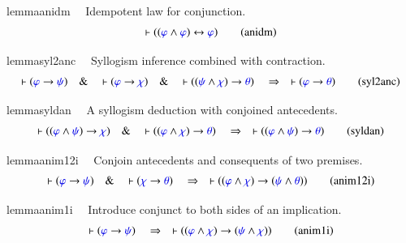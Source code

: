 \begin{restatable}{lemma}{anidm}~~ Idempotent law for conjunction. 
\begin{align}
\vdash ( ( \mw{\varphi} \wedge \mw{\varphi} ) \leftrightarrow \mw{\varphi}
    )\label{eq:anidm}\tag{anidm}
\end{align}
\end{restatable}

\begin{restatable}{lemma}{syl2anc}~~ Syllogism inference combined with
contraction.  ~
\begin{align}
\vdash ( \mw{\varphi} \rightarrow \mw{\psi} )\quad\&\quad \vdash ( \mw{\varphi}
    \rightarrow \mw{\chi} )\quad\&\quad \vdash ( ( \mw{\psi} \wedge \mw{\chi} )
    \rightarrow \mw{\theta} )\quad\Rightarrow\quad \vdash ( \mw{\varphi}
    \rightarrow \mw{\theta} )\label{eq:syl2anc}\tag{syl2anc}
\end{align}
\end{restatable}

\begin{restatable}{lemma}{syldan}~~ A syllogism deduction with conjoined
antecedents.  ~  ~
\begin{align}
\vdash ( ( \mw{\varphi} \wedge \mw{\psi} ) \rightarrow \mw{\chi} )\quad\&\quad
    \vdash ( ( \mw{\varphi} \wedge \mw{\chi} ) \rightarrow \mw{\theta}
    )\quad\Rightarrow\quad \vdash ( ( \mw{\varphi} \wedge \mw{\psi} )
    \rightarrow \mw{\theta} )\label{eq:syldan}\tag{syldan}
\end{align}
\end{restatable}

\begin{restatable}{lemma}{anim12i}~~ Conjoin antecedents and consequents of two
premises.  ~  ~
\begin{align}
\vdash ( \mw{\varphi} \rightarrow \mw{\psi} )\quad\&\quad \vdash ( \mw{\chi}
    \rightarrow \mw{\theta} )\quad\Rightarrow\quad \vdash ( ( \mw{\varphi}
    \wedge \mw{\chi} ) \rightarrow ( \mw{\psi} \wedge \mw{\theta} )
    )\label{eq:anim12i}\tag{anim12i}
\end{align}
\end{restatable}

\begin{restatable}{lemma}{anim1i}~~ Introduce conjunct to both sides of an
implication.  ~
\begin{align}
\vdash ( \mw{\varphi} \rightarrow \mw{\psi} )\quad\Rightarrow\quad \vdash ( (
    \mw{\varphi} \wedge \mw{\chi} ) \rightarrow ( \mw{\psi} \wedge \mw{\chi} )
    )\label{eq:anim1i}\tag{anim1i}
\end{align}
\end{restatable}

